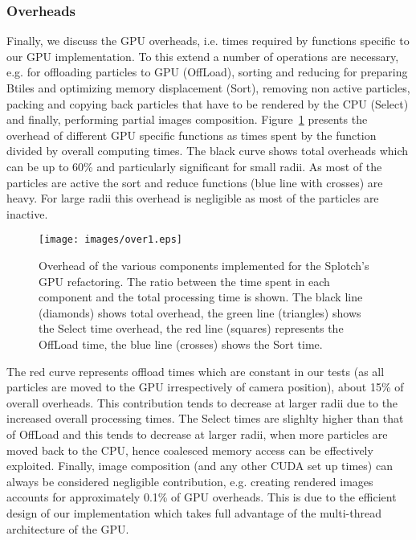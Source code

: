 \documentclass[1p]{elsarticle}
\begin{document}
\subsubsection{Overheads}
\label{sec:overhead}
Finally, we discuss the GPU overheads, i.e. times required by functions specific to our GPU implementation. To this extend a number of operations are necessary, e.g. for offloading particles to GPU (OffLoad), sorting and reducing for preparing Btiles and optimizing memory displacement (Sort), removing non active particles, packing and copying back particles that have to be rendered by the CPU (Select) and finally, performing partial images composition. Figure~\ref{fig:over} presents the overhead of different GPU specific functions as times spent by the function divided by overall computing times. The black curve shows total overheads which can be up to 60\% and particularly significant for small radii. As most of the particles are active the sort and reduce 
functions (blue line with crosses) are heavy. For large radii this overhead is negligible as most of the particles are inactive. 

\begin{figure}
\centering
\texttt{[image: images/over1.eps]}
\caption{Overhead of the various components implemented for the Splotch's
GPU refactoring. The ratio between the time spent in each component and the total processing 
time is shown. The black line (diamonds) shows total overhead, the green line (triangles) shows the Select time overhead, the red line (squares) represents the OffLoad time, the blue line (crosses) shows the Sort time.}
\label{fig:over}
\end{figure}

The red curve represents offload times which are constant in our tests (as all particles are moved to the GPU irrespectively of camera position), about 15\% of overall overheads. This contribution tends to decrease at larger radii due to the increased overall processing times. The Select times are slighlty higher than that of OffLoad and this tends to decrease at larger radii, when more particles are moved back to the CPU, hence coalesced memory access can be effectively exploited. Finally, image composition (and any other CUDA set up times) can always be considered negligible contribution, e.g. creating rendered images accounts for approximately 0.1\% of GPU overheads. This is due to the efficient design of our implementation which takes full advantage of the multi-thread architecture 
of the GPU.
\end{document}
